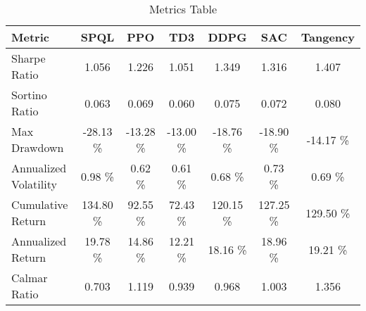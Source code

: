 \begin{table}[H]
\centering
\begin{tabular}{lcccccc}
\toprule
Metric & SPQL & PPO & TD3 & DDPG & SAC & Tangency \\
\midrule
Sharpe Ratio & 1.056 & 1.226 & 1.051 & 1.349 & 1.316 & 1.407 \\
Sortino Ratio & 0.063 & 0.069 & 0.060 & 0.075 & 0.072 & 0.080 \\
Max Drawdown & -28.13 \% & -13.28 \% & -13.00 \% & -18.76 \% & -18.90 \% & -14.17 \% \\
Annualized Volatility & 0.98 \% & 0.62 \% & 0.61 \% & 0.68 \% & 0.73 \% & 0.69 \% \\
Cumulative Return & 134.80 \% & 92.55 \% & 72.43 \% & 120.15 \% & 127.25 \% & 129.50 \% \\
Annualized Return & 19.78 \% & 14.86 \% & 12.21 \% & 18.16 \% & 18.96 \% & 19.21 \% \\
Calmar Ratio & 0.703 & 1.119 & 0.939 & 0.968 & 1.003 & 1.356 \\
\bottomrule
\end{tabular}
\caption{Metrics Table}
\label{tab:metrics_table}
\end{table}